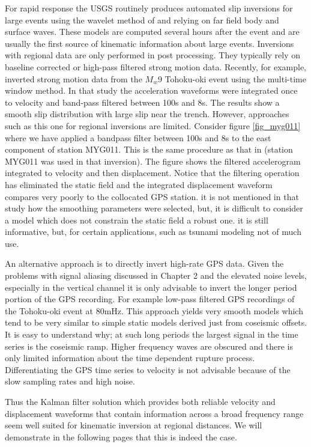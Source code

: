 For rapid response the USGS routinely produces automated slip inversions for large events using the wavelet method of \citet{ji2002} and relying on far field body and surface waves. These models are computed several hours after the event and are usually the first source of kinematic information about large events. Inversions with regional data are only performed in post processing. They typically rely on baseline corrected or high-pass filtered strong motion data. Recently, for example, \citet{suzuki2011} inverted strong motion data from the $M_w$9 Tohoku-oki event using the multi-time window method. In that study the acceleration waveforms were integrated once to velocity and band-pass filtered between 100s and 8s. The results show a smooth slip distribution with large slip near the trench. However, approaches such as this one for regional inversions are limited. Consider figure \ref{fig_myg011} where we have applied a bandpass filter between 100s and 8s to the east component of station MYG011. This is the same procedure as that in \citet{suzuki2011} (station MYG011 was used in that inversion). The figure shows the filtered accelerogram integrated to velocity and then displacement. Notice that the filtering operation has eliminated the static field and the integrated displacement waveform compares very poorly to the collocated GPS station. it is not mentioned in that study how the smoothing parameters were selected, but, it is difficult to consider a model which does not constrain the static field a robust one. it is still informative, but, for certain applications, such as tsunami modeling not of much use.

An alternative approach is to directly invert high-rate GPS data. Given the problems with signal aliasing discussed in Chapter 2 and the elevated noise levels, especially in the vertical channel it is only advisable to invert the longer period portion of the GPS recording. For example \citet{yue2011} low-pass filtered GPS recordings of the Tohoku-oki event at 80mHz. This approach yields very smooth models which tend to be very similar to simple static models derived just from coseismic offsets. It is easy to understand why; at such long periods the largest signal in the time series is the coseismic ramp. Higher frequency waves are obscured and there is only limited information about the time dependent rupture process. Differentiating the GPS time series to velocity is not advisable because of the slow sampling rates and high noise.

Thus the Kalman filter solution which provides both reliable velocity and displacement waveforms that contain information across a broad frequency range seem well suited for kinematic inversion at regional distances. We will demonstrate in the following pages that this is indeed the case.

